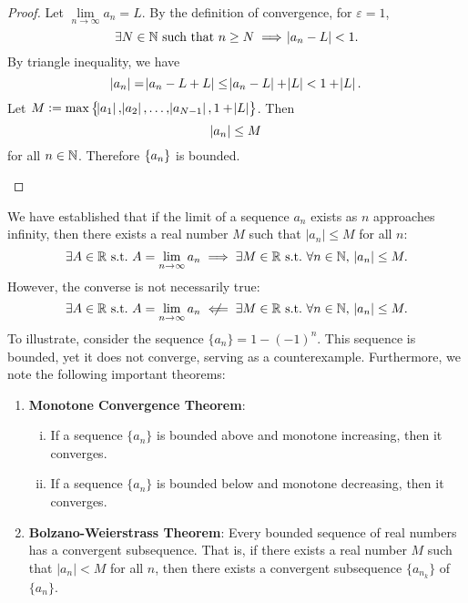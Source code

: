 \documentclass[11pt,openany]{article}
\begin{document}
\newpage
{}
\begin{proof}
	Let $\lim\limits_{n\to\infty}a_n=L$. By the definition of convergence, for $\varepsilon=1$,  \[
	\exists N\in\mathbb{N}\ \text{such that}\ n\geq N\implies\abs{a_n-L}<1.
	\] By triangle inequality, we have \[
	\abs{a_n}=\abs{a_n-L+L}\leq\abs{a_n-L}+\abs{L}<1+\abs{L}.
	\] Let $M:=\max\set{\abs{a_1},\abs{a_2},\dots,\abs{a_{N-1}},1+\abs{L}}$. Then \[
	\abs{a_n}\leq M
	\] for all $n\in\mathbb{N}$. Therefore $\set{a_n}$ is bounded.
\begin{center}
	
\end{center}
\end{proof}
\vfill
\begin{note}
	We have established that if the limit of a sequence \(a_n\) exists as \(n\) approaches infinity, then there exists a real number \(M\) such that \(\lvert a_n \rvert \leq M\) for all \(n\): \[
	\exists A\in\R\ \text{s.t.}\ A=\lim_{n\to\infty}a_n\implies\exists M\in\R\ \text{s.t.}\ \forall n\in\N,\ \abs{a_n}\leq M.
	\]However, the converse is not necessarily true: \[
	\exists A\in\R\ \text{s.t.}\ A=\lim_{n\to\infty}a_n\centernot\impliedby\exists M\in\R\ \text{s.t.}\ \forall n\in\N,\ \abs{a_n}\leq M.
	\] To illustrate, consider the sequence \(\{a_n\} = 1 - (-1)^n\). This sequence is bounded, yet it does not converge, serving as a counterexample.
	\newpage
	Furthermore, we note the following important theorems:
	\begin{enumerate}
		\item \textbf{Monotone Convergence Theorem}:
		\begin{enumerate}[(i)]
			\item If a sequence \(\{a_n\}\) is bounded above and monotone increasing, then it converges.
			\item If a sequence \(\{a_n\}\) is bounded below and monotone decreasing, then it converges.
		\end{enumerate}
		\item \textbf{Bolzano-Weierstrass Theorem}: Every bounded sequence of real numbers has a convergent subsequence. That is, if there exists a real number \(M\) such that \(\lvert a_n \rvert < M\) for all \(n\), then there exists a convergent subsequence \(\{a_{n_k}\}\) of \(\{a_n\}\).
	\end{enumerate}
\end{note}
\end{document}
